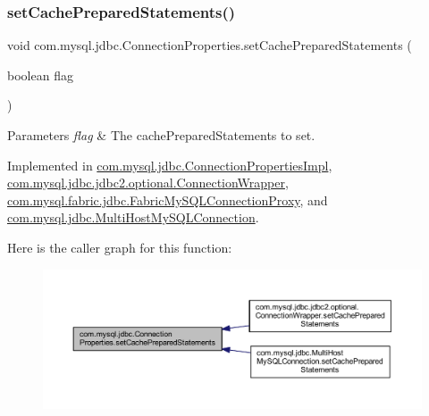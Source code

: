 \subsubsection{\texorpdfstring{set\+Cache\+Prepared\+Statements()}{setCachePreparedStatements()}}
{\footnotesize\ttfamily void com.\+mysql.\+jdbc.\+Connection\+Properties.\+set\+Cache\+Prepared\+Statements (\begin{DoxyParamCaption}\item[{boolean}]{flag }\end{DoxyParamCaption})}


\begin{DoxyParams}{Parameters}
{\em flag} & The cache\+Prepared\+Statements to set. \\
\hline
\end{DoxyParams}


Implemented in \mbox{\hyperlink{classcom_1_1mysql_1_1jdbc_1_1_connection_properties_impl_a735b9ad315c67ef52c1e968613d2429f}{com.\+mysql.\+jdbc.\+Connection\+Properties\+Impl}}, \mbox{\hyperlink{classcom_1_1mysql_1_1jdbc_1_1jdbc2_1_1optional_1_1_connection_wrapper_aa4df80c0af9ab1c8788c6d09d641d33b}{com.\+mysql.\+jdbc.\+jdbc2.\+optional.\+Connection\+Wrapper}}, \mbox{\hyperlink{classcom_1_1mysql_1_1fabric_1_1jdbc_1_1_fabric_my_s_q_l_connection_proxy_aaab3f129240c57122a1b4a8c7a48deb7}{com.\+mysql.\+fabric.\+jdbc.\+Fabric\+My\+S\+Q\+L\+Connection\+Proxy}}, and \mbox{\hyperlink{classcom_1_1mysql_1_1jdbc_1_1_multi_host_my_s_q_l_connection_a867db979855487f8231b63c63c2f1172}{com.\+mysql.\+jdbc.\+Multi\+Host\+My\+S\+Q\+L\+Connection}}.

Here is the caller graph for this function\+:\nopagebreak
\begin{figure}[H]
\begin{center}
\leavevmode
\includegraphics[width=350pt]{interfacecom_1_1mysql_1_1jdbc_1_1_connection_properties_a990fe5790551ed49878ecc8bceb750a5_icgraph}
\end{center}
\end{figure}
\mbox{\label{interfacecom_1_1mysql_1_1jdbc_1_1_connection_properties_abf45e0839d48fe28bb22d334118f807f}} 
